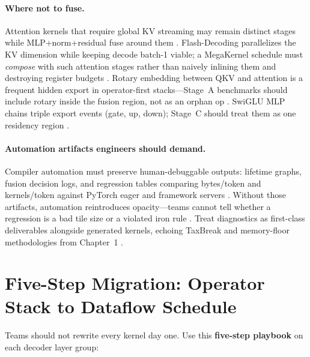\paragraph{Where not to fuse.}
Attention kernels that require global KV streaming may remain distinct stages while MLP+norm+residual fuse around them \citep{dao2022flashattention,dao2023flashdecoding}.
Flash-Decoding parallelizes the KV dimension while keeping decode batch-1 viable; a MegaKernel schedule must \emph{compose} with such attention stages rather than naively inlining them and destroying register budgets \citep{dao2023flashdecoding}.
Rotary embedding between QKV and attention is a frequent hidden export in operator-first stacks---Stage~A benchmarks should include rotary inside the fusion region, not as an orphan op \citep{patel2025llminference}.
SwiGLU MLP chains triple export events (gate, up, down); Stage~C should treat them as one residency region \citep{taxbreak2026}.

\paragraph{Automation artifacts engineers should demand.}
Compiler automation must preserve human-debuggable outputs: lifetime graphs, fusion decision logs, and regression tables comparing bytes/token and kernels/token against PyTorch eager and framework servers \citep{yirage2026}.
Without those artifacts, automation reintroduces opacity---teams cannot tell whether a regression is a bad tile size or a violated iron rule \citep{chen2020compilerbasedhardw}.
Treat diagnostics as first-class deliverables alongside generated kernels, echoing TaxBreak and memory-floor methodologies from Chapter~1 \citep{taxbreak2026,memoryfloor2026}.

\section{Five-Step Migration: Operator Stack to Dataflow Schedule}
\label{sec:migration_playbook}

Teams should not rewrite every kernel day one.
Use this \textbf{five-step playbook} on each decoder layer group:

